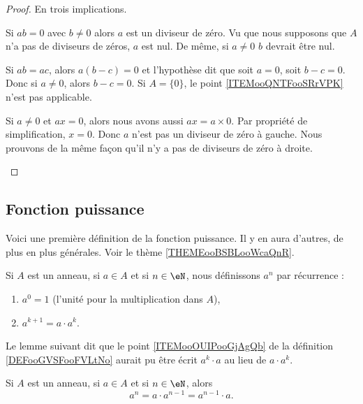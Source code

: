 \begin{proof}
	En trois implications.
	\begin{subproof}

		Si \( ab=0\) avec \( b\neq 0\) alors \( a\) est un diviseur de zéro. Vu que nous supposons que \( A\) n'a pas de diviseurs de zéros, \( a\) est nul. De même, si \( a\neq 0\) \( b\) devrait être nul.

		Si \( ab=ac\), alors \( a(b-c)=0\) et l'hypothèse dit que soit \( a=0\), soit \( b-c=0\). Donc si \( a\neq 0\), alors \( b-c=0\).
		Si \( A=\{ 0 \}\), le point \ref{ITEMooQNTFooSRrVPK} n'est pas applicable.

		Si \( a\neq 0\) et \( ax=0\), alors nous avons aussi \( ax=a\times 0\). Par propriété de simplification, \( x=0\). Donc \( a\) n'est pas un diviseur de zéro à gauche. Nous prouvons de la même façon qu'il n'y a pas de diviseurs de zéro à droite.
	\end{subproof}
\end{proof}


\subsection{Fonction puissance}

Voici une première définition de la fonction puissance. Il y en aura d'autres, de plus en plus générales. Voir le thème \ref{THEMEooBSBLooWcaQnR}.
\begin{definition}\label{DEFooGVSFooFVLtNo}
	Si \( A\) est un anneau, si \( a\in A\) et si \( n\in \eN\), nous définissons \( a^n\) par récurrence :
	\begin{enumerate}
		\item
		      \( a^0=1\) (l'unité pour la multiplication dans \( A\)),
		\item       \label{ITEMooOUIPooGjAgQb}
		      \( a^{k+1}=a\cdot a^{k}\).
	\end{enumerate}
\end{definition}

Le lemme suivant dit que le point \ref{ITEMooOUIPooGjAgQb} de la définition \ref{DEFooGVSFooFVLtNo} aurait pu être écrit \( a^k\cdot a\) au lieu de \( a\cdot a^k\).
\begin{lemma}        \label{LEMooWPARooYLZlzr}
	Si \( A\) est un anneau, si \( a\in A\) et si \( n\in \eN\), alors
	\begin{equation}
		a^n=a\cdot a^{n-1}=a^{n-1}\cdot a.
	\end{equation}
\end{lemma}

